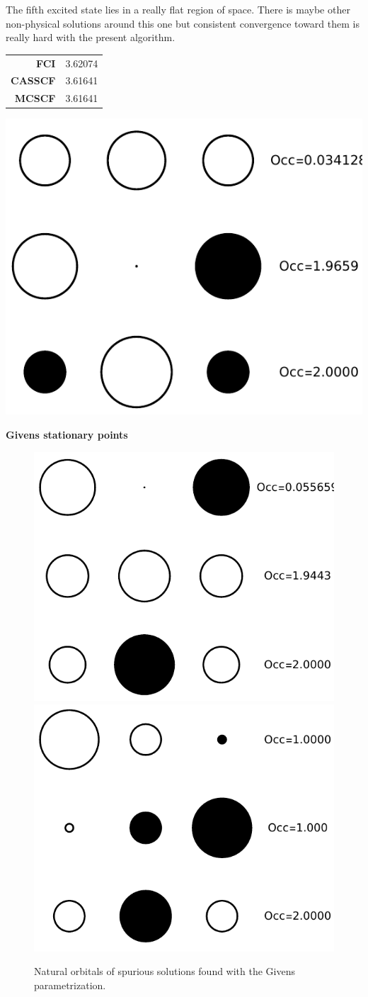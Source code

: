 \documentclass[11pt,a4paper]{article}
\begin{document}
The fifth excited state lies in a really flat region of space. There is maybe other non-physical solutions around this one but consistent convergence toward them is really hard with the present algorithm.
\begin{minipage}{0.3\textwidth}
  \centering
  \begin{tabular}{r|c}
    \textbf{FCI} & 3.62074 \\
    \textbf{CASSCF} & 3.61641 \\
    \textbf{MCSCF} & 3.61641
  \end{tabular}
\end{minipage}
\hfill
\begin{minipage}{0.6\textwidth}
  \centering
  \includegraphics[width=0.49\linewidth]{Figures/H3_ES5_CAS_NO}
  \label{fig:H3_ES5_NO}
\end{minipage}

\textbf{Givens stationary points}

\begin{figure}
  \centering
  \includegraphics[width=0.28\linewidth]{Figures/H3_Givens1_NO}
  \hspace{0.65cm}
  \includegraphics[width=0.28\linewidth]{Figures/H3_Givens2_NO}
  \caption{
    Natural orbitals of spurious solutions found with the Givens parametrization.
    \label{fig:H2ooCIS}}
\end{figure}
\end{document}
